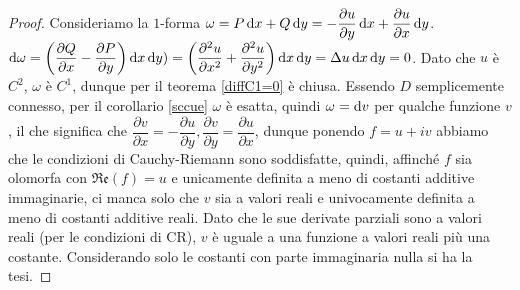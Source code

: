 \begin{proof}
  Consideriamo la $1$-forma $\omega=P\mathop{}\!\mathrm{d} x+Q\mathop{}\!\mathrm{d} y=-\dfrac{\partial u}{\partial y}\mathop{}\!\mathrm{d} x+\dfrac{\partial u}{\partial x}\mathop{}\!\mathrm{d} y$.
  $\mathop{}\!\mathrm{d} \omega=\left(\dfrac{\partial Q}{\partial x}-\dfrac{\partial P}{\partial y}\right)\mathop{}\!\mathrm{d} x\mathop{}\!\mathrm{d} y)=\left(\dfrac{\partial^2 u}{\partial x^2}+\dfrac{\partial^2 u}{\partial y^2}\right)\mathop{}\!\mathrm{d} x\mathop{}\!\mathrm{d} y=\Delta u\mathop{}\!\mathrm{d} x\mathop{}\!\mathrm{d} y=0$.
  Dato che $u$ è $C^2$, $\omega$ è $C^1$, dunque per il teorema \ref{diffC1=0} è chiusa.
  Essendo $D$ semplicemente connesso, per il corollario \ref{sccue} $\omega$ è esatta, quindi $\omega=\mathop{}\!\mathrm{d} v$ per qualche funzione $v$, il che significa che $\dfrac{\partial v}{\partial x}=-\dfrac{\partial u}{\partial y}, \dfrac{\partial v}{\partial y}=\dfrac{\partial u}{\partial x}$, dunque ponendo $f=u+iv$ abbiamo che le condizioni di Cauchy-Riemann sono soddisfatte, quindi, affinché $f$ sia olomorfa con $\mathfrak{Re}(f)=u$ e unicamente definita a meno di costanti additive immaginarie, ci manca solo che $v$ sia a valori reali e univocamente definita a meno di costanti additive reali.
  Dato che le sue derivate parziali sono a valori reali (per le condizioni di CR), $v$ è uguale a una funzione a valori reali più una costante. Considerando solo le costanti con parte immaginaria nulla si ha la tesi.
\end{proof}
